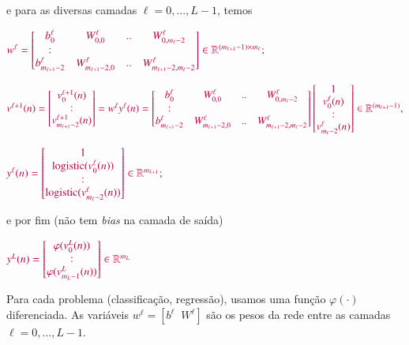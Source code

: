 \documentclass[12pt,a4paper]{article}
\def\RR{\mathbb{R}}
\DeclareMathOperator{\logistic}{logistic}
\begin{document}
\noindent e para as diversas camadas $\ell=0,...,L-1$, temos


$\color{purple}
w^\ell = \begin{bmatrix}
	b_0^\ell & W_{0,0}^\ell & .. & W_{0,m_\ell-2}^\ell\\
	:\\
	b_{m_{\ell+1}-2}^\ell & W_{m_{\ell+1}-2,0}^\ell & .. & W_{m_{\ell+1}-2,m_\ell-2}^\ell\\
\end{bmatrix}
\in \RR^{(m_{\ell+1}-1)\times m_\ell};
$


$\color{purple}
v^{\ell+1}(n) = 
\begin{bmatrix}
v^{\ell+1}_0(n)\\
:\\
v^{\ell+1}_{m_{\ell+1}-2}(n)
\end{bmatrix}
=w^\ell y^\ell(n)=
\begin{bmatrix}
	b_0^\ell & W_{0,0}^\ell & .. & W_{0,m_\ell-2}^\ell\\
	:\\
	b_{m_{\ell+1}-2}^\ell & W_{m_{\ell+1}-2,0}^\ell & .. & W_{m_{\ell+1}-2,m_\ell-2}^\ell\\
\end{bmatrix}
\begin{bmatrix}
	1\\
	 v_0^\ell(n)\\
	:\\
	 v_{m_\ell-2}^\ell(n)
\end{bmatrix}
\in \RR^{(m_{\ell+1}-1)},
$
 


$\color{purple}
y^{\ell}(n) = \begin{bmatrix}
	1\\
	\logistic(v_0^{\ell}(n))\\
	:\\
	\logistic(v_{m_{\ell}-2}^{\ell}(n))
\end{bmatrix}
\in \RR^{m_{\ell+1}};
$

\noindent e por fim (não tem \textit{bias} na camada de saída)

$\color{purple}
y^L(n) = \begin{bmatrix}
	\varphi(v_0^L(n))\\
	:\\
	\varphi(v_{m_L-1}^L(n))
\end{bmatrix}
\in \RR^{m_L}
$

Para cada problema (classificação, regressão), usamos uma função $\varphi(\cdot)$ diferenciada. As variáveis $w^\ell=[b^\ell\;\;W^\ell]$ são os pesos da rede entre as camadas $\ell=0,...,L-1$.
\end{document}
